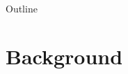 \date{9th Dec, 2015}







\begin{frame}
  \titlepage
\end{frame}

\begin{frame}{Outline}
  \tableofcontents
\end{frame}

\section{Background}

